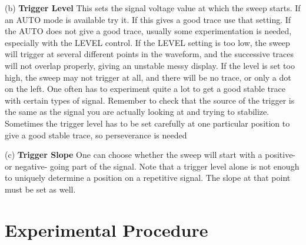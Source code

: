 \begin{enumerate}
(b) {\bf Trigger Level} This sets the signal voltage value at which the sweep starts. If an AUTO mode is available try it. If this gives a good trace use that setting. If the AUTO does not give a good trace, usually some experimentation is needed, especially with the LEVEL control. If the LEVEL setting is too low, the sweep will trigger at several different points in the waveform, and the successive traces will not overlap properly, giving an unstable messy display. If the level is set too high, the sweep may not trigger at all, and there will be no trace, or only a dot on the left. One often has to experiment quite a lot to get a good stable trace with certain types of signal. Remember to check that the source of the trigger is the same as the signal you are actually looking at and trying to stabilize. Sometimes the trigger level has to be set carefully at one particular position to give a good stable trace, so perseverance is needed

(c) {\bf Trigger Slope} One can choose whether the sweep will start with a positive- or negative- going  part of the signal. Note that a trigger level alone is not enough to uniquely determine a position on a repetitive signal. The slope at that point must be set as well.
\end{enumerate}

\section{{\bf Experimental Procedure}}

